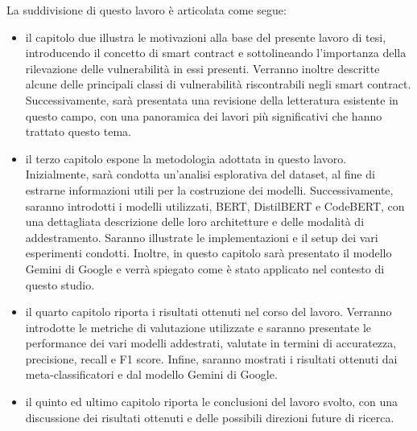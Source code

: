 \documentclass[../../Thesis.tex]{subfiles}
\begin{document}
La suddivisione di questo lavoro è articolata come segue:
\begin{itemize}
    \item il capitolo due illustra le motivazioni alla base del presente lavoro di tesi, introducendo il concetto di smart contract e sottolineando l'importanza della rilevazione delle vulnerabilità in essi presenti. Verranno inoltre descritte alcune delle principali classi di vulnerabilità riscontrabili negli smart contract. Successivamente, sarà presentata una revisione della letteratura esistente in questo campo, con una panoramica dei lavori più significativi che hanno trattato questo tema.
    \item il terzo capitolo espone la metodologia adottata in questo lavoro. Inizialmente, sarà condotta un'analisi esplorativa del dataset, al fine di estrarne informazioni utili per la costruzione dei modelli.  
    Successivamente, saranno introdotti i modelli utilizzati, BERT, DistilBERT e CodeBERT, con una dettagliata descrizione delle loro architetture e delle modalità di addestramento. Saranno illustrate le implementazioni e il setup dei vari esperimenti condotti. Inoltre, in questo capitolo sarà presentato il modello Gemini di Google e verrà spiegato come è stato applicato nel contesto di questo studio.
    \item il quarto capitolo riporta i risultati ottenuti nel corso del lavoro. Verranno introdotte le metriche di valutazione utilizzate e saranno presentate le performance dei vari modelli addestrati, valutate in termini di accuratezza, precisione, recall e F1 score. Infine, saranno mostrati i risultati ottenuti dai meta-classificatori e dal modello Gemini di Google.
    \item il quinto ed ultimo capitolo riporta le conclusioni del lavoro svolto, con una discussione dei risultati ottenuti e delle possibili direzioni future di ricerca.     
\end{itemize}
\end{document}
